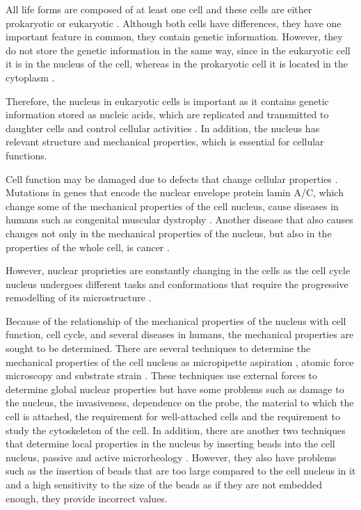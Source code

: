 \documentclass[12pt, a4paper]{article} %
\begin{document}
	All life forms are composed of at least one cell \cite{mazzarello1999unifying} and these cells are either prokaryotic or eukaryotic \cite{vellai1999origin}. Although both cells have differences, they have one important feature in common, they contain genetic information. However, they do not store the genetic information in the same way, since in the eukaryotic cell it is in the nucleus of the cell, whereas in the prokaryotic cell it is located in the cytoplasm \cite{cook1983mucus}.
	
	\setlength{\parskip}{4mm}
	
	Therefore, the nucleus in eukaryotic cells is important as it contains genetic information stored as nucleic acids, which are replicated and transmitted to daughter cells and control cellular activities \cite{ossareh2001protein}. In addition, the nucleus has relevant structure and mechanical properties, which is essential for cellular functions. 
	
	Cell function may be damaged due to defects that change cellular properties \cite{lammerding2011mechanics}. Mutations in genes that encode the nuclear envelope protein lamin A/C, which change some of the mechanical properties of the cell nucleus, cause diseases in humans such as congenital muscular dystrophy \cite{lammerding2004lamin}. Another disease that also causes changes not only in the mechanical properties of the nucleus, but also in the properties of the whole cell, is cancer \cite{jacobs2012introduction, lekka2019measuring, cross2007nanomechanical}.
	
	However, nuclear proprieties are constantly changing in the cells as the cell cycle nucleus undergoes different tasks and conformations that require the progressive remodelling of its microstructure \cite{liu2017mitosis}.
	
	Because of the relationship of the mechanical properties of the nucleus with cell function, cell cycle, and several diseases in humans, the mechanical properties are sought to be determined. There are several techniques to determine the mechanical properties of the cell nucleus as micropipette aspiration \cite{gonzalez2019advances}, atomic force microscopy \cite{janel2019stiffness} and substrate strain \cite{murphy2011automated}. These techniques use external forces to determine global nuclear properties but have some problems such as damage to the nucleus, the invasiveness, dependence on the probe, the material to which the cell is attached, the requirement for well-attached cells and the requirement to study the cytoskeleton of the cell. In addition, there are another two techniques that determine local properties in the nucleus by inserting beads into the cell nucleus, passive and active microrheology \cite{lammerding2011mechanics, lammerding2007nuclear, de2007direct}. However, they also have problems such as the insertion of beads that are too large compared to the cell nucleus in it and a high sensitivity to the size of the beads as if they are not embedded enough, they provide incorrect values.
	
\end{document}
